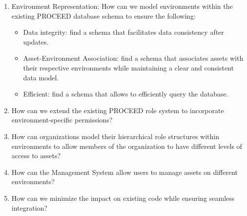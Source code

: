 \begin{enumerate}

	\item Environment Representation: How can we model environments within the existing
	      PROCEED database schema to ensure the following:
	      \begin{itemize}
		      \item Data integrity: find a schema that facilitates data consistency after updates.
		      \item Asset-Environment Association: find a schema that associates assets with their
		            respective environments while maintaining a clear and consistent data model.
		      \item Efficient: find a schema that allows to efficiently query the database.
	      \end{itemize}


	\item How can we extend the existing PROCEED role system to incorporate
	      environment-specific permissions?

	\item How can organizations model their hierarchical role structures within environments
	      to allow members of the organization to have different levels of access to assets?


	\item How can the Management System allow users to manage assets on different
	      environments?



	\item How can we minimize the impact on existing code while ensuring seamless integration?


\end{enumerate}

